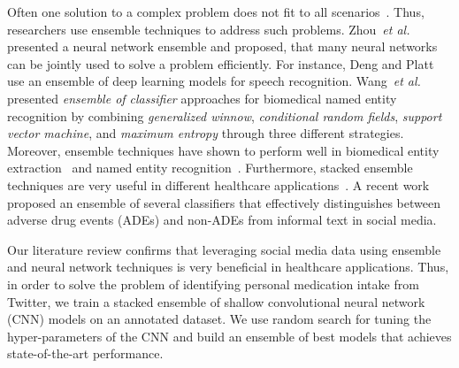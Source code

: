 \documentclass[conference]{IEEEtran}
\begin{document}

Often one solution to a complex problem does not fit to all scenarios~\cite{bell2010all}.
Thus, researchers use ensemble techniques to address such problems. Zhou~\emph{et al.}~\cite{zhou2002ensembling} presented a neural network ensemble and proposed, that many neural networks can be jointly used to solve a problem efficiently. 
For instance, Deng and Platt~\cite{deng2014ensemble} use an ensemble of deep learning models for speech 
recognition. Wang~\emph{et al.}~\cite{wang2008biomedical} presented \textit{ensemble of classifier} approaches 
for biomedical named entity recognition by combining \textit{generalized winnow}, 
\textit{conditional random fields}, \textit{support vector machine}, and \textit{maximum entropy} through three 
different strategies. Moreover, ensemble techniques have shown to perform well in 
biomedical entity extraction~\cite{ekbal2013stacked} and named entity 
recognition~\cite{sikdar2012differential, speck2014ensemble}. Furthermore, 
stacked ensemble techniques are very useful in different healthcare 
applications~\cite{dinakar2014stacked, speck2014ensemble}. A recent work~\cite{liu2016ensemble} proposed an ensemble of several classifiers that effectively distinguishes between adverse drug events (ADEs) and non-ADEs from  
informal text in social media. 

Our literature review confirms that leveraging social media data using ensemble and 
neural network techniques is very beneficial in healthcare applications. Thus, in order to solve the problem of identifying personal 
medication intake from Twitter, we train a stacked ensemble of shallow convolutional neural 
network (CNN) models on an annotated dataset. We use random 
search for tuning the hyper-parameters of the CNN and build an ensemble of best models that 
achieves state-of-the-art performance. 
\end{document}
